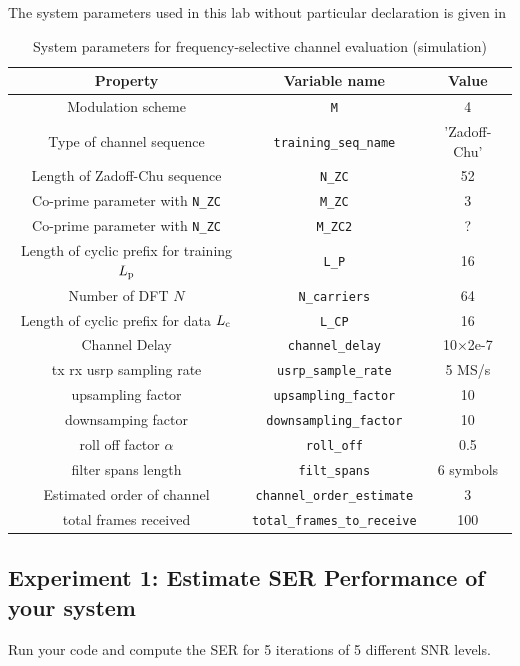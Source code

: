 \documentclass{book}
\begin{document}
The system parameters used in this lab without particular declaration is given in 
\begin{table}[h!]
	\caption{System parameters for frequency-selective channel evaluation (simulation)}
	\begin{center}
		\begin{tabular}{|c|c|c|} \hline
			Property & Variable name &Value  \\ \hline	
			Modulation scheme & \verb|M| & 4 \\ \hline
			Type of channel sequence & \verb|training_seq_name| & 'Zadoff-Chu' \\ \hline
			Length of Zadoff-Chu sequence & \verb|N_ZC| & 52 \\ \hline
			Co-prime parameter with \verb|N_ZC| & \verb|M_ZC| & 3 \\ \hline
			Co-prime parameter with \verb|N_ZC| & \verb|M_ZC2| & ? \\ \hline
			Length of cyclic prefix for training ${L_\mathrm{p}}$ & \verb|L_P| & 16 \\ \hline
			Number of DFT $N$ & \verb|N_carriers| & 64 \\ \hline
			Length of cyclic prefix for data ${L_\mathrm{c}}$ & \verb|L_CP| & 16 \\ \hline			
			Channel Delay & \verb|channel_delay| & 10$\times$2e-7 \\ \hline
			tx rx usrp sampling rate & \verb|usrp_sample_rate| & 5 MS/s \\ \hline
			upsampling factor &  \verb|upsampling_factor| & 10   \\ \hline 
			downsamping factor &  \verb|downsampling_factor| & 10   \\ \hline 
			roll off factor $\alpha$  & \verb|roll_off| & 0.5 \\ \hline
			filter spans length & \verb|filt_spans| & 6 symbols\\ \hline
			Estimated order of channel & \verb|channel_order_estimate| & 3 \\ \hline
			total frames received & \verb|total_frames_to_receive| & 100\\ \hline
		\end{tabular}
	\end{center} \label{sc_tab_sys_par_exp}
\end{table}

\subsection{Experiment 1: Estimate SER Performance of your system}
Run your code and compute the SER for 5 iterations of 5 different SNR levels. 
\end{document}
